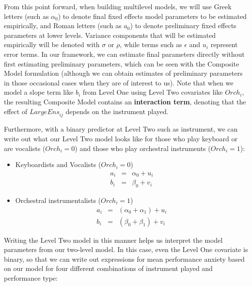 \documentclass[
]{krantz}
\providecommand{\tightlist}{%
  \setlength{\itemsep}{0pt}\setlength{\parskip}{0pt}}
\begin{document}
From this point forward, when building multilevel models, we will use Greek letters (such as \(\alpha_{0}\)) to denote final fixed effects model parameters to be estimated empirically, and Roman letters (such as \(a_{0}\)) to denote preliminary fixed effects parameters at lower levels. Variance components that will be estimated empirically will be denoted with \(\sigma\) or \(\rho\), while terms such as \(\epsilon\) and \(u_{i}\) represent error terms. In our framework, we can estimate final parameters directly without first estimating preliminary parameters, which can be seen with the Composite Model formulation (although we can obtain estimates of preliminary parameters in those occasional cases when they are of interest to us). Note that when we model a slope term like \(b_{i}\) from Level One using Level Two covariates like \(\textstyle{Orch}_{i}\), the resulting Composite Model contains an \textbf{interaction term}, denoting that the effect of \(\textstyle{LargeEns}_{ij}\) depends on the instrument played.

Furthermore, with a binary predictor at Level Two such as instrument, we can write out what our Level Two model looks like for those who play keyboard or are vocalists (\(\textstyle{Orch}_{i}=0\)) and those who play orchestral instruments (\(\textstyle{Orch}_{i}=1\)):

\begin{itemize}
\tightlist
\item
  Keyboardists and Vocalists (\(\textstyle{Orch}_{i}=0\))
  \begin{eqnarray*}
  a_{i} & = & \alpha_{0}+u_{i} \\
  b_{i} & = & \beta_{0}+v_{i}
  \end{eqnarray*}
\item
  Orchestral instrumentalists (\(\textstyle{Orch}_{i}=1\))
  \begin{eqnarray*}
  a_{i} & = & (\alpha_{0}+\alpha_{1})+u_{i} \\
  b_{i} & = & (\beta_{0}+\beta_{1})+v_{i}
  \label{eq:level2byorch}
  \end{eqnarray*}
\end{itemize}

Writing the Level Two model in this manner helps us interpret the model parameters from our two-level model. In this case, even the Level One covariate is binary, so that we can write out expressions for mean performance anxiety based on our model for four different combinations of instrument played and performance type:
\end{document}
